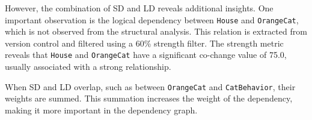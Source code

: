 However, the combination of SD and LD reveals additional insights. One important observation is the logical dependency between \texttt{House} and \texttt{OrangeCat}, which is not observed from the structural analysis. This relation is extracted from version control and filtered using a 60\% strength filter. The strength metric reveals that \texttt{House} and \texttt{OrangeCat} have a significant co-change value of 75.0, usually associated with a strong relationship.

When SD and LD overlap, such as between \texttt{OrangeCat} and \texttt{CatBehavior}, their weights are summed. This summation increases the weight of the dependency, making it more important in the dependency graph.


